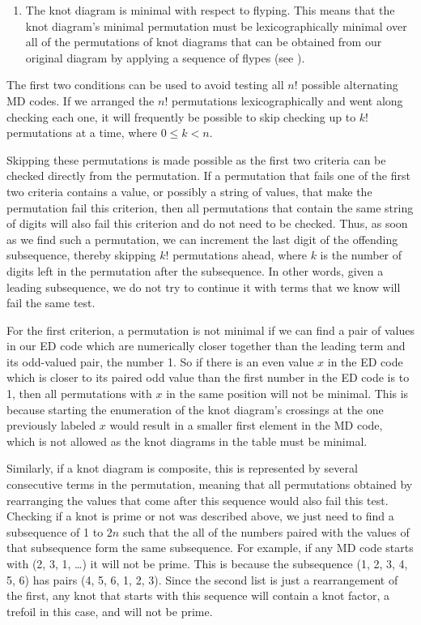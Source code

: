 \begin{paper}
\begin{enumerate}
\item The knot diagram is minimal with respect to flyping.
This means that the knot diagram's minimal permutation must be lexicographically
minimal over all of the permutations of knot diagrams that can be obtained from
our original diagram by applying a sequence of flypes (see \figMoves).
\end{enumerate}


The first two conditions can be used to avoid testing all $n!$ possible
alternating MD codes.
If we arranged the $n!$ permutations lexicographically and went along checking
each one, it will frequently be possible to skip checking up to $k!$
permutations at a time, where $0\leq k<n$.

Skipping these permutations is made possible as the first two criteria can be
checked directly from the permutation.
If a permutation that fails one of the first two criteria contains a value, or
possibly a string of values, that make the permutation fail this criterion, then
all permutations that contain the same string of digits will also fail this
criterion and do not need to be checked.
Thus, as soon as we find such a permutation, we can increment the last digit of
the offending subsequence, thereby skipping $k!$ permutations ahead, where $k$
is the number of digits left in the permutation after the subsequence.
In other words, given a leading subsequence, we do not try to continue it with
terms that we know will fail the same test.

For the first criterion, a permutation is not minimal if we can find a pair of
values in our ED code which are numerically closer together than the leading
term and its odd-valued pair, the number 1.
So if there is an even value $x$ in the ED code which is closer to its paired
odd value than the first number in the ED code is to 1, then all permutations
with $x$ in the same position will not be minimal.
This is because starting the enumeration of the knot diagram's crossings at the
one previously labeled $x$ would result in a smaller first element in the MD
code, which is not allowed as the knot diagrams in the table must be minimal.


Similarly, if a knot diagram is composite, this is represented by several
consecutive terms in the permutation, meaning that all permutations obtained by
rearranging the values that come after this sequence would also fail this test.
Checking if a knot is prime or not was described above, we just need to find a
subsequence of 1 to $2n$ such that the all of the numbers paired with the values
of that subsequence form the same subsequence.
For example, if any MD code starts with (2, 3, 1, \dots) it will not be prime.
This is because the subsequence (1, 2, 3, 4, 5, 6) has pairs (4, 5, 6, 1, 2, 3).
Since the second list is just a rearrangement of the first, any knot that starts
with this sequence will contain a knot factor, a trefoil in this case, and will
not be prime.


\end{paper}
